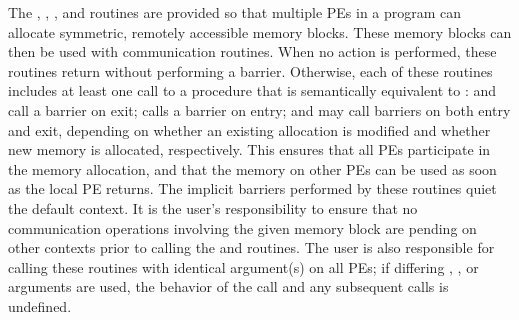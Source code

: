 \begin{apidefinition}
{    The , , , and  routines
    are provided  so that multiple \acp{PE} in a program can allocate symmetric,
    remotely accessible memory blocks.  These memory blocks can then be used with
    \openshmem communication routines.  When no action is performed, these
    routines return without performing a barrier.
    Otherwise, each of these routines includes at least one
    call to a procedure that is semantically equivalent to :
     and  call a
    barrier on exit;  calls a barrier on entry; and
     may call barriers on both entry and exit, depending on
    whether an existing allocation is modified and whether new memory is allocated, respectively.
    This ensures that all
    \acp{PE} participate in the memory allocation, and that the memory on other
    \acp{PE} can be used as soon as the local \ac{PE} returns.
    The implicit barriers performed by these routines quiet the
    default context.  It is the user's responsibility to ensure that no
    communication operations involving the given memory block are pending on
    other contexts prior to calling
    the  and  routines.
    The user is also
    responsible for calling these routines with identical argument(s) on all
    \acp{PE}; if differing , , or  arguments are used, the behavior of the call
    and any subsequent \openshmem calls is undefined.
}


\end{apidefinition}

